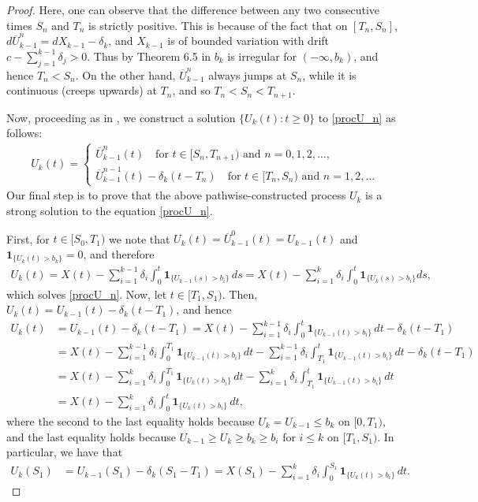 \documentclass[12pt,reqno]{amsart}
\theoremstyle{definition}
\theoremstyle{remark}
\newcommand{\ind}{\mathbf{1}}
\begin{document}
\begin{proof}
		
		Here, one can observe that the difference between any two consecutive times $S_n$ and $T_n$ is strictly positive. 
	This is because of the fact that on $[T_n, S_n]$, $d \overline{U}^n_{k-1} = d X_{k-1} -\delta_k$, and $X_{k-1}$ is of 
	bounded variation with drift $c - \sum_{j=1}^{k-1} \delta_j > 0$. Thus by Theorem 6.5 in \cite{kyprianou2014} $b_k$ is irregular for $(-\infty, b_k)$, and hence $T_n <  S_n$.
On the other hand, $\overline{U}^n_{k-1}$ always jumps at $S_n$, while it is continuous (creeps upwards) at $T_n$, and so $T_n < S_n < T_{n+1}$.

Now, proceeding as in \cite{kyprianouloeffen2010}, we construct a solution $\{U_k(t):t\geq0\}$ to \eqref{procU_n} as follows:
		\begin{align}\label{pathwise_constr}
			U_k(t)= \begin{cases} \overline{U}_{k-1}^n(t)  \quad \text{for $t\in[S_n,T_{n+1})$ and $n=0,1,2,\dots,$} \\ 
				\overline{U}_{k-1}^{n-1}(t)-\delta_k(t-T_n) \quad \text{for $t\in[T_n,S_n)$ and $n=1,2,\dots$}  \end{cases}
		\end{align}
		Our final step is to prove that the above pathwise-constructed process $U_k$ is a strong solution to the equation \eqref{procU_n}. 
		
		First, for  $t\in[S_0,T_1)$ we note that $U_k(t) = \overline{U}_{k-1}^0(t) =U_{k-1}(t)$ and $\ind_{\{U_{k}(t)>b_k\}}=0$, 
and therefore
		\begin{align*}
			U_k(t)=X(t)-\sum_{i=1}^{k-1}\delta_i\int_0^t \ind_{\{U_{k-1}(s)>b_i\}}\,ds
			=X(t)-\sum_{i=1}^{k}\delta_i\int_0^t \ind_{\{U_{k}(s)>b_i\}}ds,
		\end{align*}
	which solves \eqref{procU_n}.
		 Now, let $t\in[T_1,S_1)$. Then, $U_k(t)=U_{k-1}(t)-\delta_k(t-T_1)$, and hence
		\begin{align*}
		U_k(t) &= U_{k-1}(t) - \delta_k (t-T_1) = X(t)-\sum_{i=1}^{k-1}\delta_i \int_0^t \ind_{\{U_{k-1}(t)>b_i\}}\,dt - 
		\delta_k (t-T_1) \\&= X(t)-\sum_{i=1}^{k-1}\delta_i \int_0^{T_1} \ind_{\{U_{k-1}(t)>b_i\}}\,dt  -
		\sum_{i=1}^{k-1}\delta_i \int_{T_1}^t \ind_{\{U_{k-1}(t)>b_i\}}\,dt - \delta_k (t-T_1) \\
		&= X(t)-\sum_{i=1}^{k}\delta_i \int_0^{T_1} \ind_{\{U_{k}(t)>b_i\}}\,dt  -\sum_{i=1}^{k}\delta_i \int_{T_1}^t \ind_{\{U_{k-1}(t)>b_i\}}\,dt \\
				&= X(t)-\sum_{i=1}^{k}\delta_i \int_0^{t} \ind_{\{U_k(t)>b_i\}}\,dt,		\end{align*}
		where the second to the last equality holds because $U_k =U_{k-1} \leq b_k$ on $[0, T_1)$, and the last equality holds because 
		$U_{k-1} \geq U_k \geq b_k \geq b_i$  for $i \leq k$ on $[T_1,S_1)$. 		
		In particular, we have that
				\begin{align}
		U_k(S_1) &=U_{k-1}(S_1)-\delta_k(S_1-T_1)= X(S_1)-\sum_{i=1}^{k}\delta_i \int_0^{S_1} \ind_{\{U_k(t)>b_i\}}\,dt.		\label{Y_at_S_1}\end{align}
		

\end{proof}
\end{document}
